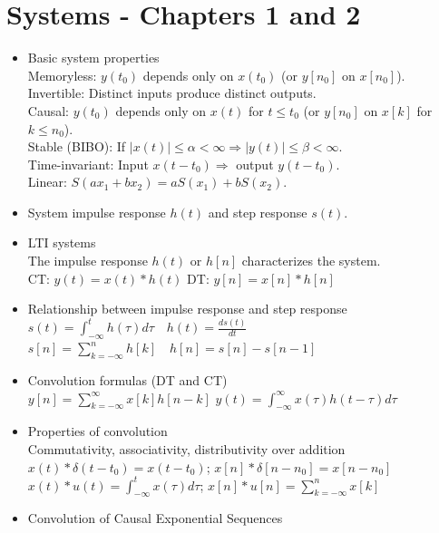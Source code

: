 \documentclass[10pt, twocolumn]{article}
\begin{document}
\section{Systems - Chapters 1 and 2}
\begin{itemize}
    \item Basic system properties \\
    Memoryless: $y(t_0)$ depends only on $x(t_0)$ (or $y[n_0]$ on $x[n_0]$). \\
    Invertible: Distinct inputs produce distinct outputs. \\
    Causal: $y(t_0)$ depends only on $x(t)$ for $t \le t_0$ (or $y[n_0]$ on $x[k]$ for $k \le n_0$). \\
    Stable (BIBO): If $|x(t)| \le \alpha < \infty \Rightarrow |y(t)| \le \beta < \infty$. \\
    Time-invariant: Input $x(t-t_0) \Rightarrow$ output $y(t-t_0)$. \\
    Linear: $S(ax_1+bx_2) = aS(x_1)+bS(x_2)$.
    \item System impulse response $h(t)$ and step response $s(t)$.
    \item LTI systems \\
    The impulse response $h(t)$ or $h[n]$ characterizes the system. \\
    CT: $y(t) = x(t) * h(t)$ \quad DT: $y[n] = x[n] * h[n]$
    \item Relationship between impulse response and step response \\
    $s(t) = \int_{-\infty}^t h(\tau)d\tau \quad h(t) = \frac{ds(t)}{dt}$ \\
    $s[n] = \sum_{k=-\infty}^n h[k] \quad h[n] = s[n] - s[n-1]$
    \item Convolution formulas (DT and CT) \\
    $y[n] = \sum_{k=-\infty}^{\infty} x[k]h[n-k]$ \quad $y(t) = \int_{-\infty}^{\infty} x(\tau)h(t-\tau)d\tau$
    \item Properties of convolution \\
    Commutativity, associativity, distributivity over addition \\
    $x(t) * \delta(t-t_0) = x(t-t_0)$; \quad $x[n] * \delta[n-n_0] = x[n-n_0]$ \\
    $x(t) * u(t) = \int_{-\infty}^t x(\tau)d\tau$; \quad $x[n] * u[n] = \sum_{k=-\infty}^n x[k]$
    \item Convolution of Causal Exponential Sequences\newline

\end{itemize}
\end{document}
